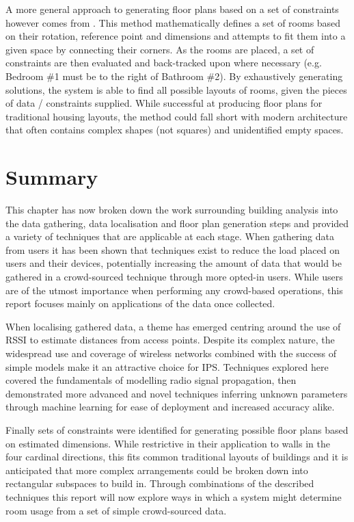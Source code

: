 \documentclass{UoYCSproject}
\begin{document}
            A more general approach to generating floor plans based on a set of constraints however comes from \citet{charman1994constraint}. This method mathematically defines a set of rooms based on their rotation, reference point and dimensions and attempts to fit them into a given space by connecting their corners. As the rooms are placed, a set of constraints are then evaluated and back-tracked upon where necessary (e.g. Bedroom \#1 must be to the right of Bathroom \#2). By exhaustively generating solutions, the system is able to find all possible layouts of rooms, given the pieces of data / constraints supplied. While successful at producing floor plans for traditional housing layouts, the method could fall short with modern architecture that often contains complex shapes (not squares) and unidentified empty spaces.
            
        \section{Summary}
        \label{sec:relsum}
        
	        This chapter has now broken down the work surrounding building analysis into the data gathering, data localisation and floor plan generation steps and provided a variety of techniques that are applicable at each stage. When gathering data from users it has been shown that techniques exist to reduce the load placed on users and their devices, potentially increasing the amount of data that would be gathered in a crowd-sourced technique through more opted-in users. While users are of the utmost importance when performing any crowd-based operations, this report focuses mainly on applications of the data once collected.
            
            When localising gathered data, a theme has emerged centring around the use of RSSI to estimate distances from access points. Despite its complex nature, the  widespread use and coverage of wireless networks combined with the success of simple models make it an attractive choice for IPS. Techniques explored here covered the fundamentals of modelling radio signal propagation, then demonstrated more advanced and novel techniques inferring unknown parameters through machine learning for ease of deployment and increased accuracy alike.
            
            Finally sets of constraints were identified for generating possible floor plans based on estimated dimensions. While restrictive in their application to walls in the four cardinal directions, this fits common traditional layouts of buildings and it is anticipated that more complex arrangements could be broken down into rectangular subspaces to build in. Through combinations of the described techniques this report will now explore ways in which a system might determine room usage from a set of simple crowd-sourced data.
\end{document}
